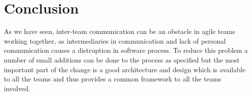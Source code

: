 \section{Conclusion}\label{sec:conclusion}
As we have seen, inter-team communication can be an obstacle in agile teams working together, as intermediaries in communication and lack of personal communication causes a distruption in software process.
To reduce this problem a number of small additions can be done to the process as specified but the most important part of the change is a good architecture and design which is available to all the teams and thus provides a common framework to all the teams involved.
